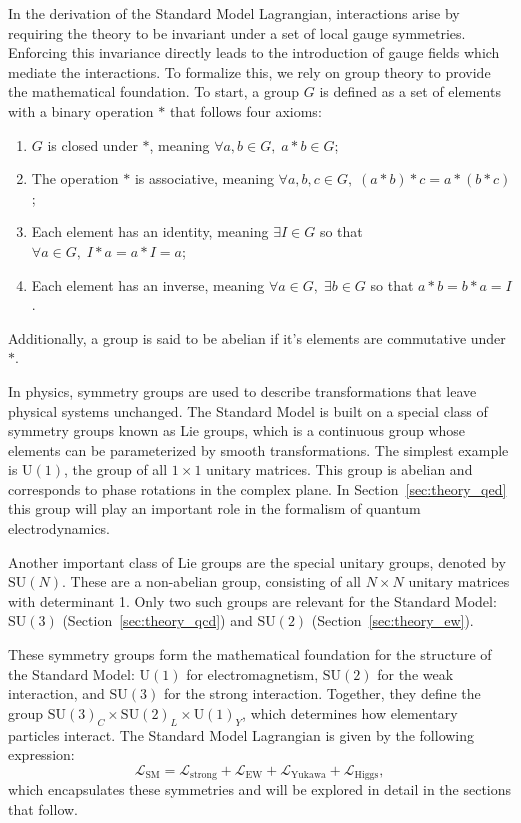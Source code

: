 In the derivation of the Standard Model Lagrangian, interactions arise by requiring the theory to be invariant under a set of local gauge symmetries. Enforcing this invariance directly leads to the introduction of gauge fields which mediate the interactions. To formalize this, we rely on group theory to provide the mathematical foundation. To start, a group $G$ is defined as a set of elements with a binary operation $\ast$ that follows four axioms:
\begin{enumerate}
  \item $G$ is closed under $\ast$, meaning $\forall a, b \in G, \; a \ast b \in G$;  
  \item The operation $\ast$ is associative, meaning $\forall a, b, c \in G, \; (a \ast b) \ast c = a \ast (b \ast c)$;
  \item Each element has an identity, meaning $\exists I \in G$ so that $\forall a \in G, \; I \ast a = a \ast I = a$;
  \item Each element has an inverse, meaning $\forall a \in G, \; \exists b \in G$ so that $a \ast b = b \ast a = I$.
\end{enumerate}
Additionally, a group is said to be abelian if it's elements are commutative under $\ast$. 

In physics, symmetry groups are used to describe transformations that leave physical systems unchanged. The Standard Model is built on a special class of symmetry groups known as Lie groups, which is a continuous group whose elements can be parameterized by smooth transformations. The simplest example is $\mathrm{U}(1)$, the group of all $1 \times 1$ unitary matrices. This group is abelian and corresponds to phase rotations in the complex plane. In Section~\ref{sec:theory_qed} this group will play an important role in the formalism of quantum electrodynamics. 

Another important class of Lie groups are the special unitary groups, denoted by $\mathrm{SU}(N)$. These are a non-abelian group, consisting of all $N \times N$ unitary matrices with determinant 1. Only two such groups are relevant for the Standard Model: $\mathrm{SU}(3)$ (Section~\ref{sec:theory_qcd}) and $\mathrm{SU}(2)$ (Section~\ref{sec:theory_ew}).

These symmetry groups form the mathematical foundation for the structure of the Standard Model: $\mathrm{U}(1)$ for electromagnetism, $\mathrm{SU}(2)$ for the weak interaction, and $\mathrm{SU}(3)$ for the strong interaction. Together, they define the group $\mathrm{SU}(3)_C \times \mathrm{SU}(2)_L \times \mathrm{U}(1)_Y$, which determines how elementary particles interact. The Standard Model Lagrangian is given by the following expression:
\begin{equation}
  \mathcal{L}_{\mathrm{SM}} = \mathcal{L}_{\mathrm{strong}} + \mathcal{L}_{\mathrm{EW}} + \mathcal{L}_{\mathrm{Yukawa}} + \mathcal{L}_{\mathrm{Higgs}},
  \label{eq:sm_lagrangian}
\end{equation}
which encapsulates these symmetries and will be explored in detail in the sections that follow.

